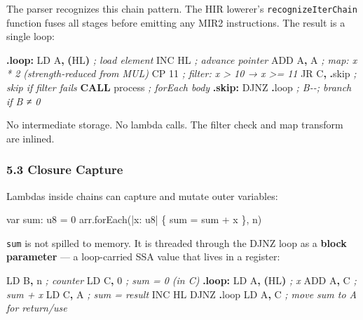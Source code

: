 \documentclass[
  11pt,
]{article}
\newenvironment{Shaded}{\begin{snugshade}}{\end{snugshade}}
\newcommand{\BuiltInTok}[1]{#1}
\newcommand{\CommentTok}[1]{\textcolor[rgb]{0.56,0.35,0.01}{\textit{#1}}}
\newcommand{\ControlFlowTok}[1]{\textcolor[rgb]{0.13,0.29,0.53}{\textbf{#1}}}
\newcommand{\DecValTok}[1]{\textcolor[rgb]{0.00,0.00,0.81}{#1}}
\newcommand{\FunctionTok}[1]{\textcolor[rgb]{0.13,0.29,0.53}{\textbf{#1}}}
\newcommand{\NormalTok}[1]{#1}
\newcommand{\OperatorTok}[1]{\textcolor[rgb]{0.81,0.36,0.00}{\textbf{#1}}}
\begin{document}
The parser recognizes this chain pattern. The HIR lowerer's
\texttt{recognizeIterChain} function fuses all stages before emitting
any MIR2 instructions. The result is a single loop:

\begin{Shaded}
\begin{Highlighting}[]
\FunctionTok{.loop:}
\NormalTok{    LD A}\OperatorTok{,} \OperatorTok{(}\NormalTok{HL}\OperatorTok{)}       \CommentTok{; load element}
    \BuiltInTok{INC}\NormalTok{ HL           }\CommentTok{; advance pointer}
    \BuiltInTok{ADD}\NormalTok{ A}\OperatorTok{,}\NormalTok{ A         }\CommentTok{; map: x * 2  (strength{-}reduced from MUL)}
\NormalTok{    CP }\DecValTok{11}            \CommentTok{; filter: x \textgreater{} 10 → x \textgreater{}= 11}
\NormalTok{    JR C}\OperatorTok{,} \OperatorTok{.}\NormalTok{skip      }\CommentTok{; skip if filter fails}
    \ControlFlowTok{CALL}\NormalTok{ process     }\CommentTok{; forEach body}
\FunctionTok{.skip:}
\NormalTok{    DJNZ }\OperatorTok{.}\NormalTok{loop       }\CommentTok{; B{-}{-}; branch if B ≠ 0}
\end{Highlighting}
\end{Shaded}

No intermediate storage. No lambda calls. The filter check and map
transform are inlined.

\hypertarget{closure-capture}{%
\subsubsection{5.3 Closure Capture}\label{closure-capture}}

Lambdas inside chains can capture and mutate outer variables:

\begin{Shaded}
\begin{Highlighting}[]
\NormalTok{var sum: u8 = 0}
\NormalTok{arr.forEach(|x: u8| \{ sum = sum + x \}, n)}
\end{Highlighting}
\end{Shaded}

\texttt{sum} is not spilled to memory. It is threaded through the DJNZ
loop as a \textbf{block parameter} --- a loop-carried SSA value that
lives in a register:

\begin{Shaded}
\begin{Highlighting}[]
\NormalTok{    LD B}\OperatorTok{,}\NormalTok{ n          }\CommentTok{; counter}
\NormalTok{    LD C}\OperatorTok{,} \DecValTok{0}          \CommentTok{; sum = 0 (in C)}
\FunctionTok{.loop:}
\NormalTok{    LD A}\OperatorTok{,} \OperatorTok{(}\NormalTok{HL}\OperatorTok{)}       \CommentTok{; x}
    \BuiltInTok{ADD}\NormalTok{ A}\OperatorTok{,}\NormalTok{ C         }\CommentTok{; sum + x}
\NormalTok{    LD C}\OperatorTok{,}\NormalTok{ A          }\CommentTok{; sum = result}
    \BuiltInTok{INC}\NormalTok{ HL}
\NormalTok{    DJNZ }\OperatorTok{.}\NormalTok{loop}
\NormalTok{    LD A}\OperatorTok{,}\NormalTok{ C          }\CommentTok{; move sum to A for return/use}
\end{Highlighting}
\end{Shaded}
\end{document}
